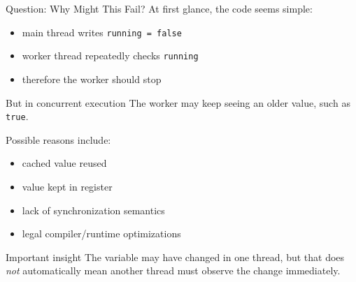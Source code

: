 \documentclass[aspectratio=169,11pt]{beamer}
\begin{document}
	\begin{frame}{Question: Why Might This Fail?}
		At first glance, the code seems simple:
		
		\begin{itemize}
			\item main thread writes \texttt{running = false}
			\item worker thread repeatedly checks \texttt{running}
			\item therefore the worker should stop
		\end{itemize}
		
		\vspace{0.3cm}
		
		\begin{alertblock}{But in concurrent execution}
			The worker may keep seeing an older value, such as \texttt{true}.
		\end{alertblock}
		
		\vspace{0.3cm}
		
		Possible reasons include:
		\begin{itemize}
			\item cached value reused
			\item value kept in register
			\item lack of synchronization semantics
			\item legal compiler/runtime optimizations
		\end{itemize}
		
		\vspace{0.3cm}
		
		\begin{exampleblock}{Important insight}
			The variable may have changed in one thread, but that does \emph{not} automatically mean another thread must observe the change immediately.
		\end{exampleblock}
	\end{frame}
	
\end{document}
